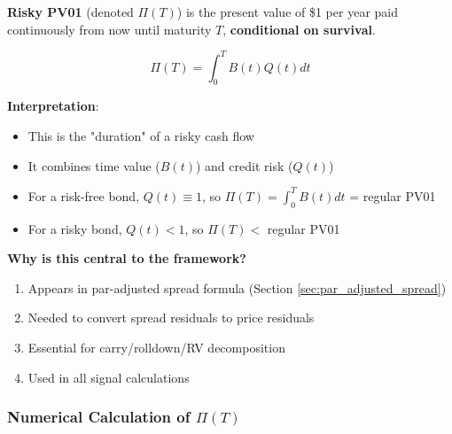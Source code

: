 \documentclass[11pt,a4paper]{article}
\begin{document}
\begin{keybox}
\textbf{Risky PV01} (denoted $\Pi(T)$) is the present value of \$1 per year paid continuously from now until maturity $T$, \textbf{conditional on survival}.

\begin{equation}
\Pi(T) = \int_0^T B(t)Q(t)dt
\end{equation}

\textbf{Interpretation}:
\begin{itemize}
    \item This is the "duration" of a risky cash flow
    \item It combines time value ($B(t)$) and credit risk ($Q(t)$)
    \item For a risk-free bond, $Q(t) \equiv 1$, so $\Pi(T) = \int_0^T B(t)dt$ = regular PV01
    \item For a risky bond, $Q(t) < 1$, so $\Pi(T) <$ regular PV01
\end{itemize}

\textbf{Why is this central to the framework?}
\begin{enumerate}
    \item Appears in par-adjusted spread formula (Section \ref{sec:par_adjusted_spread})
    \item Needed to convert spread residuals to price residuals
    \item Essential for carry/rolldown/RV decomposition
    \item Used in all signal calculations
\end{enumerate}
\end{keybox}

\subsubsection{Numerical Calculation of $\Pi(T)$}
\end{document}
